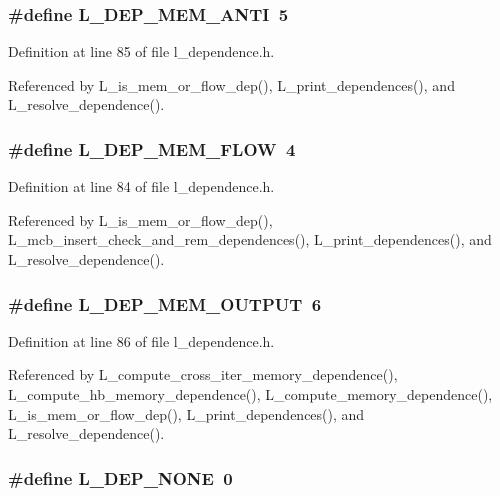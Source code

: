 \subsubsection{\setlength{\rightskip}{0pt plus 5cm}\#define L\_\-DEP\_\-MEM\_\-ANTI~5}\label{l__dependence_8h_701044c9da61b4177e3b1059458290f7}




Definition at line 85 of file l\_\-dependence.h.

Referenced by L\_\-is\_\-mem\_\-or\_\-flow\_\-dep(), L\_\-print\_\-dependences(), and L\_\-resolve\_\-dependence().
\subsubsection{\setlength{\rightskip}{0pt plus 5cm}\#define L\_\-DEP\_\-MEM\_\-FLOW~4}\label{l__dependence_8h_cfdf914f0b4330290fb5e493b28219f7}




Definition at line 84 of file l\_\-dependence.h.

Referenced by L\_\-is\_\-mem\_\-or\_\-flow\_\-dep(), L\_\-mcb\_\-insert\_\-check\_\-and\_\-rem\_\-dependences(), L\_\-print\_\-dependences(), and L\_\-resolve\_\-dependence().
\subsubsection{\setlength{\rightskip}{0pt plus 5cm}\#define L\_\-DEP\_\-MEM\_\-OUTPUT~6}\label{l__dependence_8h_eb463aeba71453ced885e88d79fb70f5}




Definition at line 86 of file l\_\-dependence.h.

Referenced by L\_\-compute\_\-cross\_\-iter\_\-memory\_\-dependence(), L\_\-compute\_\-hb\_\-memory\_\-dependence(), L\_\-compute\_\-memory\_\-dependence(), L\_\-is\_\-mem\_\-or\_\-flow\_\-dep(), L\_\-print\_\-dependences(), and L\_\-resolve\_\-dependence().
\subsubsection{\setlength{\rightskip}{0pt plus 5cm}\#define L\_\-DEP\_\-NONE~0}\label{l__dependence_8h_a86183580d9b521d02223327976d7a40}




